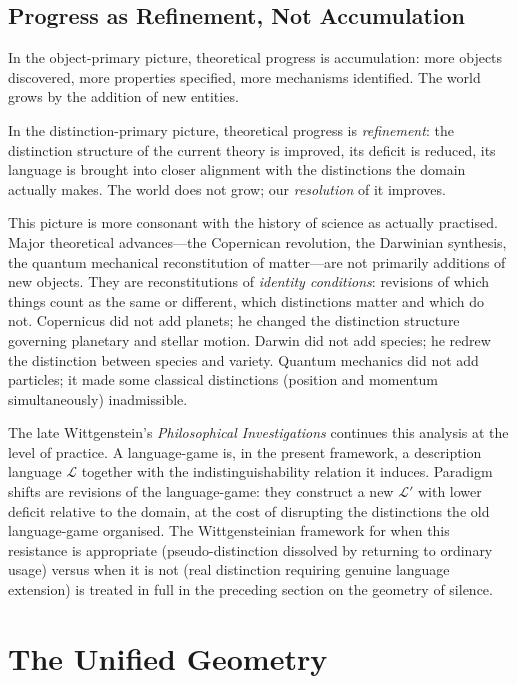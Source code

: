 \documentclass[12pt, letterpaper]{article}
\theoremstyle{remark}
\begin{document}
\subsection{Progress as Refinement, Not Accumulation}

In the object-primary picture, theoretical progress is accumulation: more
objects discovered, more properties specified, more mechanisms identified.
The world grows by the addition of new entities.

In the distinction-primary picture, theoretical progress is
\emph{refinement}: the distinction structure of the current theory is
improved, its deficit is reduced, its language is brought into closer
alignment with the distinctions the domain actually makes.  The world does
not grow; our \emph{resolution} of it improves.

This picture is more consonant with the history of science as actually
practised.  Major theoretical advances---the Copernican revolution, the
Darwinian synthesis, the quantum mechanical reconstitution of matter---are
not primarily additions of new objects.  They are reconstitutions of
\emph{identity conditions}: revisions of which things count as the same or
different, which distinctions matter and which do not.  Copernicus did not
add planets; he changed the distinction structure governing planetary and
stellar motion.  Darwin did not add species; he redrew the distinction
between species and variety.  Quantum mechanics did not add particles; it
made some classical distinctions (position and momentum simultaneously)
inadmissible.

The late Wittgenstein's \textit{Philosophical Investigations} continues
this analysis at the level of practice.  A language-game is, in the present
framework, a description language $\mathcal{L}$ together with the
indistinguishability relation it induces.  Paradigm shifts are revisions of
the language-game: they construct a new $\mathcal{L}'$ with lower deficit
relative to the domain, at the cost of disrupting the distinctions the old
language-game organised.  The Wittgensteinian framework for when this
resistance is appropriate (pseudo-distinction dissolved by returning to
ordinary usage) versus when it is not (real distinction requiring genuine
language extension) is treated in full in the preceding section on the
geometry of silence.

\section{The Unified Geometry}
\end{document}
